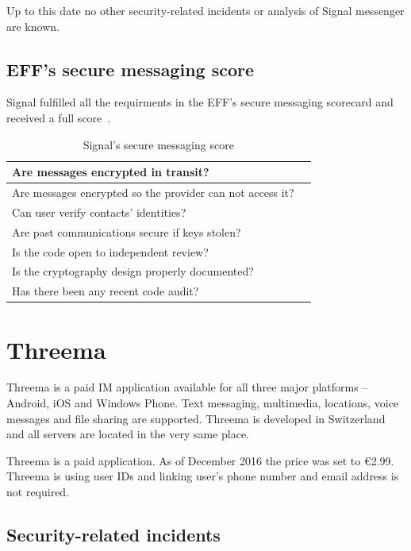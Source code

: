\documentclass[thesis=M,english]{FITthesis}[2012/10/20]
\newcommand{\cmark}{\ding{51}}%
\begin{document}
Up to this date no other security-related incidents or analysis of Signal messenger are known.

\subsection{EFF's secure messaging score}

Signal fulfilled all the requirments in the EFF's secure messaging scorecard and received a full score~\cite{eff-score}.

\begin{table}[htb]
	\centering
	\caption{Signal's secure messaging score}
	\label{my-label}
	\begin{tabular}{|l|l|}
		\hline
		Are messages encrypted in transit? & \cmark \\\hline
		Are messages encrypted so the provider can not access it? & \cmark \\ \hline
		Can user verify contacts' identities? & \cmark \\ \hline
		Are past communications secure if keys stolen? & \cmark \\ \hline
		Is the code open to independent review? & \cmark \\ \hline
		Is the cryptography design properly documented? & \cmark \\ \hline
		Has there been any recent code audit? & \cmark \\ \hline
	\end{tabular}
\end{table}


\section{Threema}

Threema is a paid IM application available for all three major platforms -- Android, iOS and Windows Phone. Text messaging, multimedia, locations, voice messages and file sharing are supported. Threema is developed in Switzerland and all servers are located in the very same place.

Threema is a paid application. As of December 2016 the price was set to \euro2.99. Threema is using user IDs and linking user's phone number and email address is not required.

\subsection{Security-related incidents}
\end{document}
